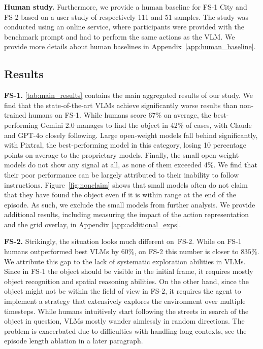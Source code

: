 \documentclass{article}
\theoremstyle{plain}
\theoremstyle{definition}
\theoremstyle{remark}
\newcommand{\challenge}{FS-1}
\newcommand{\hardchallenge}{FS-2}
\begin{document}
\textbf{Human study.} Furthermore, we provide a human baseline for \challenge{} City and \hardchallenge{} based on a user study of respectively 111 and 51 samples. The study was conducted using an online service, where participants were provided with the benchmark prompt and had to perform the same actions as the VLM. We provide more details about human baselines in Appendix~\ref{app:human_baseline}. 

\subsection{Results}


\textbf{\challenge{}.} \cref{tab:main_results} contains the main aggregated results of our study. We find that the state-of-the-art VLMs achieve significantly worse results than non-trained humans on \challenge{}. While humans score $67\%$ on average, the best-performing Gemini 2.0 manages to find the object in 42\% of cases, with Claude and GPT-4o closely following. Large open-weight models fall behind significantly, with Pixtral, the best-performing model in this category, losing 10 percentage points on average to the proprietary models. Finally, the small open-weight models do not show any signal at all, as none of them exceeded 4\%.
We find that their poor performance can be largely attributed to their inability to follow instructions. Figure~\ref{fig:nonclaim} shows that small models often do not claim that they have found the object even if it is within range at the end of the episode.
As such, we exclude the small models from further analysis. We provide additional results, including measuring the impact of the action representation and the grid overlay, in Appendix \ref{app:additional_exps}.

\textbf{\hardchallenge{}.} Strikingly, the situation looks much different on~\hardchallenge{}. While on \challenge{} humans outperformed best VLMs by $60\%$, on \hardchallenge{} this number is closer to $835\%$. We attribute this gap to the lack of systematic exploration abilities in VLMs. Since in \challenge{} the object should be visible in the initial frame, it requires mostly object recognition and spatial reasoning abilities. On the other hand, since the object might not be within the field of view in \hardchallenge{}, it requires the agent to implement a strategy that extensively explores the environment over multiple timesteps. While humans intuitively start following the streets in search of the object in question, VLMs mostly wander aimlessly in random directions. The problem is exacerbated due to difficulties with handling long contexts, see the episode length ablation in a later paragraph.
\end{document}

